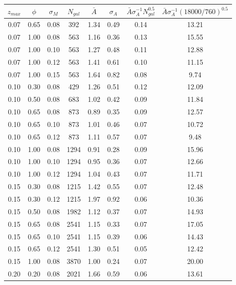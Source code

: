 \documentclass{aastex62}   	%
\begin{document}
\begin{table}
   \centering
   \begin{tabular}{|ccc|ccccc|} %
   \hline
$z_{max}$ & $\phi$ & $\sigma_{M}$ & $N_{gal}$ & $\bar{A}$ & $\sigma_A$ & $\bar{A} \sigma_A^{-1} N_{gal}^{0.5}$ & $\bar{A} \sigma_A^{-1} (18000/760)^{0.5}$ \\
\hline
0.07 & 0.65 & 0.08 & 392 &   1.34 &   0.49 &   0.14 &  13.21 \\
0.07 & 1.00 & 0.08 & 563 &   1.16 &   0.36 &   0.13 &  15.55 \\
0.07 & 1.00 & 0.10 & 563 &   1.27 &   0.48 &   0.11 &  12.88 \\
0.07 & 1.00 & 0.12 & 563 &   1.41 &   0.61 &   0.10 &  11.15 \\
0.07 & 1.00 & 0.15 & 563 &   1.64 &   0.82 &   0.08 &   9.74 \\
0.10 & 0.30 & 0.08 & 429 &   1.26 &   0.51 &   0.12 &  12.09 \\
0.10 & 0.50 & 0.08 & 683 &   1.02 &   0.42 &   0.09 &  11.84 \\
0.10 & 0.65 & 0.08 & 873 &   0.89 &   0.35 &   0.09 &  12.57 \\
0.10 & 0.65 & 0.10 & 873 &   1.01 &   0.46 &   0.07 &  10.72 \\
0.10 & 0.65 & 0.12 & 873 &   1.11 &   0.57 &   0.07 &   9.48 \\
0.10 & 1.00 & 0.08 & 1294 &   0.91 &   0.28 &   0.09 &  15.96 \\
0.10 & 1.00 & 0.10 & 1294 &   0.95 &   0.36 &   0.07 &  12.66 \\
0.10 & 1.00 & 0.12 & 1294 &   1.04 &   0.43 &   0.07 &  11.71 \\
0.15 & 0.30 & 0.08 & 1215 &   1.42 &   0.55 &   0.07 &  12.48 \\
0.15 & 0.30 & 0.12 & 1215 &   1.97 &   0.92 &   0.06 &  10.36 \\
0.15 & 0.50 & 0.08 & 1982 &   1.12 &   0.37 &   0.07 &  14.93 \\
0.15 & 0.65 & 0.08 & 2541 &   1.15 &   0.33 &   0.07 &  17.05 \\
0.15 & 0.65 & 0.10 & 2541 &   1.15 &   0.39 &   0.06 &  14.43 \\
0.15 & 0.65 & 0.12 & 2541 &   1.30 &   0.51 &   0.05 &  12.42 \\
0.15 & 1.00 & 0.08 & 3870 &   1.00 &   0.24 &   0.07 &  20.00 \\
0.20 & 0.20 & 0.08 & 2021 &   1.66 &   0.59 &   0.06 &  13.61 \\

\end{tabular}
\end{table}
\end{document}
